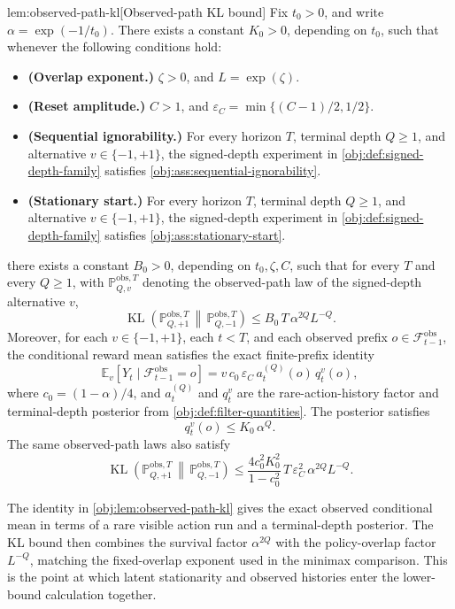 \begin{lemmav}{lem:observed-path-kl}[Observed-path KL bound]
Fix \(t_0>0\), and write \(\alpha=\exp(-1/t_0)\). There exists a constant \(K_0>0\), depending on \(t_0\), such that whenever the following conditions hold:
\begin{itemize}
\item \textbf{(Overlap exponent.)} \(\zeta>0\), and \(L=\exp(\zeta)\).
\item \textbf{(Reset amplitude.)} \(C>1\), and \(\varepsilon_C=\min\{(C-1)/2,1/2\}\).
\item \textbf{(Sequential ignorability.)} For every horizon \(T\), terminal depth \(Q\ge 1\), and alternative \(v\in\{-1,+1\}\), the signed-depth experiment in \cref{obj:def:signed-depth-family} satisfies \cref{obj:ass:sequential-ignorability}.
\item \textbf{(Stationary start.)} For every horizon \(T\), terminal depth \(Q\ge 1\), and alternative \(v\in\{-1,+1\}\), the signed-depth experiment in \cref{obj:def:signed-depth-family} satisfies \cref{obj:ass:stationary-start}.
\end{itemize}
there exists a constant \(B_0>0\), depending on \(t_0,\zeta,C\), such that for every \(T\) and every \(Q\ge 1\), with \(\mathbb P_{Q,v}^{\mathrm{obs},T}\) denoting the observed-path law of the signed-depth alternative \(v\),
\[
\operatorname{KL}\!\left(\mathbb P_{Q,+1}^{\mathrm{obs},T}\,\middle\|\,\mathbb P_{Q,-1}^{\mathrm{obs},T}\right)
\le
B_0\,T\,\alpha^{2Q}L^{-Q}.
\]
Moreover, for each \(v\in\{-1,+1\}\), each \(t<T\), and each observed prefix \(o\in\mathcal F_{t-1}^{\mathrm{obs}}\), the conditional reward mean satisfies the exact finite-prefix identity
\[
\mathbb E_v[Y_t\mid \mathcal F_{t-1}^{\mathrm{obs}}=o]
=
v\,c_0\,\varepsilon_C\,a_t^{(Q)}(o)\,q_t^v(o),
\]
where \(c_0=(1-\alpha)/4\), and \(a_t^{(Q)}\) and \(q_t^v\) are the rare-action-history factor and terminal-depth posterior from \cref{obj:def:filter-quantities}. The posterior satisfies
\[
q_t^v(o)\le K_0\,\alpha^Q .
\]
The same observed-path laws also satisfy
\[
\operatorname{KL}\!\left(\mathbb P_{Q,+1}^{\mathrm{obs},T}\,\middle\|\,\mathbb P_{Q,-1}^{\mathrm{obs},T}\right)
\le
\frac{4c_0^2K_0^2}{1-c_0^2}\,
T\,\varepsilon_C^2\,\alpha^{2Q}L^{-Q}.
\]
\end{lemmav}

The identity in \cref{obj:lem:observed-path-kl} gives the exact observed conditional mean in terms of a rare visible action run and a terminal-depth posterior. The KL bound then combines the survival factor \(\alpha^{2Q}\) with the policy-overlap factor \(L^{-Q}\), matching the fixed-overlap exponent used in the minimax comparison. This is the point at which latent stationarity and observed histories enter the lower-bound calculation together.

